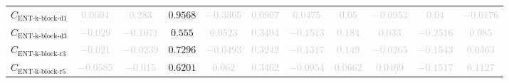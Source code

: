 \documentclass{standalone}
\newcommand{\entkblockdonename}{\text{ENT-k-block-d1}}
\newcommand{\entkblockdone}{C_{\entkblockdonename}}
\newcommand{\entkblockdthreename}{\text{ENT-k-block-d3}}
\newcommand{\entkblockdthree}{C_{\entkblockdthreename}}
\newcommand{\entkblockrthreename}{\text{ENT-k-block-r3}}
\newcommand{\entkblockrthree}{C_{\entkblockrthreename}}
\newcommand{\entkblockrfivename}{\text{ENT-k-block-r5}}
\newcommand{\entkblockrfive}{C_{\entkblockrfivename}}
\begin{document}
\begin{tabular}{lcccccccccc}
$\entkblockdone$ & \textcolor{lightgray}{$0.0604$} & \textcolor{lightgray}{$0.283$} & $0.9568$ & \textcolor{lightgray}{$-0.3365$} & \textcolor{lightgray}{$0.0907$} & \textcolor{lightgray}{$0.0475$} & \textcolor{lightgray}{$0.05$} & \textcolor{lightgray}{$-0.0953$} & \textcolor{lightgray}{$0.04$} & \textcolor{lightgray}{$-0.0176$} \\ 
$\entkblockdthree$ & \textcolor{lightgray}{$-0.029$} & \textcolor{lightgray}{$-0.1071$} & $0.555$ & \textcolor{lightgray}{$0.0523$} & \textcolor{lightgray}{$0.3404$} & \textcolor{lightgray}{$-0.1513$} & \textcolor{lightgray}{$0.184$} & \textcolor{lightgray}{$0.033$} & \textcolor{lightgray}{$-0.2516$} & \textcolor{lightgray}{$0.085$} \\ 
$\entkblockrthree$ & \textcolor{lightgray}{$-0.021$} & \textcolor{lightgray}{$-0.0239$} & $0.7296$ & \textcolor{lightgray}{$-0.0493$} & \textcolor{lightgray}{$0.3242$} & \textcolor{lightgray}{$-0.1317$} & \textcolor{lightgray}{$0.149$} & \textcolor{lightgray}{$-0.0265$} & \textcolor{lightgray}{$-0.1543$} & \textcolor{lightgray}{$0.0463$} \\ 
$\entkblockrfive$ & \textcolor{lightgray}{$-0.0585$} & \textcolor{lightgray}{$-0.015$} & $0.6201$ & \textcolor{lightgray}{$0.062$} & \textcolor{lightgray}{$0.3462$} & \textcolor{lightgray}{$-0.0954$} & \textcolor{lightgray}{$0.0662$} & \textcolor{lightgray}{$0.0469$} & \textcolor{lightgray}{$-0.1517$} & \textcolor{lightgray}{$0.1127$} \\ 
\bottomrule
\end{tabular}
\end{document}
